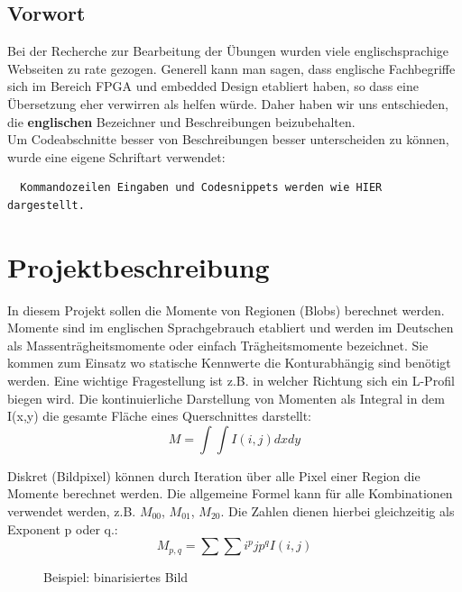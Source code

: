 \documentclass[a4paper]{report}
\begin{document}

\tableofcontents
\listoffigures




\section{Vorwort}
Bei der Recherche zur Bearbeitung der Übungen wurden viele englischsprachige Webseiten zu rate gezogen. Generell kann man sagen, dass englische Fachbegriffe sich im Bereich FPGA und embedded Design etabliert haben, so dass eine Übersetzung eher verwirren als helfen würde. Daher haben wir uns entschieden, die \textbf{englischen} Bezeichner und Beschreibungen beizubehalten.\\
Um Codeabschnitte besser von Beschreibungen besser unterscheiden zu können, wurde eine eigene Schriftart verwendet:
\begin{verbatim}
  Kommandozeilen Eingaben und Codesnippets werden wie HIER dargestellt.
\end{verbatim}

\chapter{Projektbeschreibung}
\label{Projektbeschreibung}
In diesem Projekt sollen die Momente von Regionen (Blobs) berechnet werden. Momente sind im englischen Sprachgebrauch etabliert und werden im Deutschen als Massenträgheitsmomente oder einfach Trägheitsmomente bezeichnet. Sie kommen zum Einsatz wo statische Kennwerte die Konturabhängig sind benötigt werden. Eine wichtige Fragestellung ist z.B. in welcher Richtung sich ein L-Profil biegen wird. Die kontinuierliche Darstellung von Momenten als Integral in dem I(x,y) die gesamte Fläche eines Querschnittes darstellt: $$M = \int \int I(i,j) dxdy$$

Diskret (Bildpixel) können durch Iteration über alle Pixel einer Region die Momente berechnet werden. Die allgemeine Formel kann für alle Kombinationen verwendet werden, z.B. $M_{00}$, $M_{01}$, $M_{20}$. Die Zahlen dienen hierbei gleichzeitig als Exponent p oder q.: $$M_{p,q} = \sum \sum i^p jp^q I(i,j)$$

	\begin{figure}[H]
	\centering
	\caption{Beispiel: binarisiertes Bild}
	\label{Entwurf des Projects}
	\end{figure}
\end{document}
